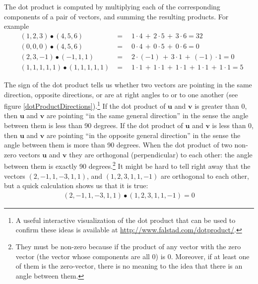    The dot product is computed by multiplying each of the corresponding 
components of a pair of vectors, and summing the resulting products. For 
example
\begin{eqnarray*}
&(1,2,3)  \bullet  (4,5,6)& = \quad 1 \cdot 4 \,+\, 2 \cdot 5 \,+\, 3 \cdot 6 
= 32 \\
&(0,0,0)  \bullet  (4,5,6)& = \quad 0 \cdot 4 \,+\, 0 \cdot 5 \,+\, 0 \cdot 6 
= 0  \\
&(2,3,-1) \bullet (-1,1,1)& = \quad 2 \cdot (-1) \,+\, 3 \cdot 1 \,+\, (-1) 
\cdot 1 = 0 \\
&(1,1,1,1,1) \bullet (1,1,1,1,1)& = \quad  
 1 \cdot 1 \,+\, 1 \cdot 1 \,+\,  1 \cdot 1 \,+\, 1 \cdot 1 \,+\, 1 \cdot 1 = 5
\end{eqnarray*}


The sign of the dot product tells us whether two vectors are pointing in the same direction, opposite directions, or are at right angles to or  to one another (see figure \ref{dotProductDirections}).\footnote{A useful interactive visualization of the dot product that can be used to confirm these ideas is available at \url{http://www.falstad.com/dotproduct/}.} If the dot product of $\textbf{u}$ and $\textbf{v}$ is greater than 0, then $\textbf{u}$ and $\textbf{v}$ are pointing ``in the same general direction'' in the sense the angle between them is less than 90 degrees.  If the dot product of $\textbf{u}$ and $\textbf{v}$ is less than 0, then $\textbf{u}$ and $\textbf{v}$ are pointing ``in the opposite general direction'' in the sense the angle between them is more than 90 degrees. When the dot product of two non-zero vectors $\textbf{u}$ and $\textbf{v}$ they are orthogonal (perpendicular) to each other: the angle between them is exactly 90 degrees.\footnote{They must be non-zero because if the product of any vector with the zero vector (the vector whose components are all $0$) is $0$. Moreover, if at least one of them is the zero-vector, there is no meaning to the idea that there is an angle between them.} It might be hard to tell right away that the vectors $(2,-1,1,-3,1,1)$, and $(1,2,3,1,1,-1)$ are orthogonal to each other, but a quick calculation 
shows us that it is true:
\begin{eqnarray*}
           (2,-1,1,-3,1,1) \bullet (1,2,3,1,1,-1) = 0
\end{eqnarray*}

